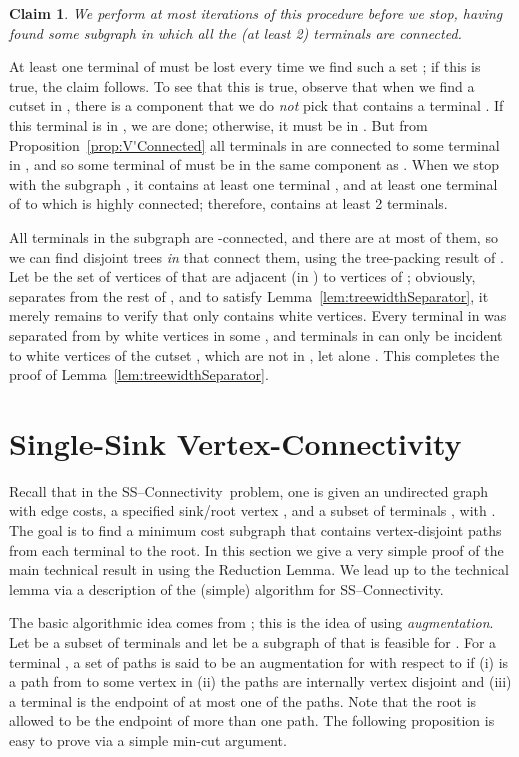 \documentclass[11pt]{article}
\newtheorem{claim}[lemma]{Claim}
\newcommand{\sskconn}{{\sc SS--Connectivity}}
\renewenvironment{proof}{\vspace{-0.1in}\noindent{\bf Proof:}}{\hspace*{\fill}\par}
\begin{document}
\begin{claim}
  We perform at most  iterations of this procedure before we stop,
  having found some subgraph  in which all the (at least 2)
  terminals are  connected.
\end{claim}
\begin{proof}
  At least one terminal of  must be lost every time we find such a
  set ; if this is true, the claim follows. To see that this is
  true, observe that when we find a cutset  in , there
  is a component that we do \emph{not} pick that contains a terminal
  . If this terminal  is in , we are done; otherwise, it
  must be in . But from Proposition~\ref{prop:V'Connected} all
  terminals in  are  connected to some terminal in , and
  so some terminal of  must be in the same component as . When
  we stop with the subgraph , it contains at least one
  terminal , and at least one terminal of  to which
   is highly connected; therefore,  contains at least 2
  terminals.
\end{proof}

All terminals in the subgraph  are -connected, and
there are at most  of them, so we can find 
disjoint trees \emph{in } that connect them, using the
tree-packing result of \cite{cs}. Let  be the set of vertices of
 that are adjacent (in ) to vertices of ; obviously, 
separates  from the rest of , and to satisfy
Lemma~\ref{lem:treewidthSeparator}, it merely remains to verify that
 only contains white vertices. Every terminal in  was
separated from  by white vertices in some , and terminals
in  can only be incident to white vertices of the cutset ,
which are not in , let alone . This completes the proof of
Lemma~\ref{lem:treewidthSeparator}.


\section{Single-Sink Vertex-Connectivity}\label{sec:kconn}
Recall that in the \sskconn~problem, one is given an undirected graph
 with edge costs, a specified sink/root vertex , and a
subset of terminals , with .  The goal is to
find a minimum cost subgraph  that contains  vertex-disjoint
paths from each terminal  to the root. In this section we
give a very simple proof of the main technical result in
\cite{ChuzhoyK08} using the Reduction Lemma. We lead up to the technical
lemma via a description of the (simple) algorithm for \sskconn.

The basic algorithmic idea comes from \cite{ChakCK08}; this is the
idea of using \emph{augmentation}. Let  be a subset of
terminals and let  be a subgraph of  that is feasible for
. For a terminal , a set of  paths  is said to be an augmentation for  with respect to
 if (i)  is a path from  to some vertex in 
(ii) the paths are internally vertex disjoint and (iii) a terminal  is the endpoint of at most one of the  paths. Note that the
root is allowed to be the endpoint of more than one path. The
following proposition is easy to prove via a simple min-cut argument.
\end{document}
